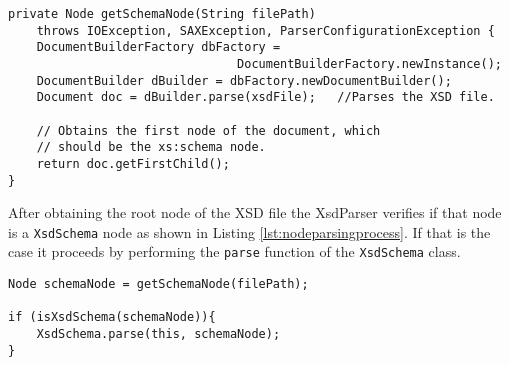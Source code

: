 \begin{minipage}{\linewidth}
\begin{lstlisting}[caption={DOM Document Parsing}, label={lst:nodelist}]
private Node getSchemaNode(String filePath) 
    throws IOException, SAXException, ParserConfigurationException {
    DocumentBuilderFactory dbFactory =                                                              
                                DocumentBuilderFactory.newInstance();
    DocumentBuilder dBuilder = dbFactory.newDocumentBuilder();
    Document doc = dBuilder.parse(xsdFile);   //Parses the XSD file.

    // Obtains the first node of the document, which 
    // should be the xs:schema node.
    return doc.getFirstChild();
}
\end{lstlisting}
\end{minipage}

\noindent
After obtaining the root node of the \ac{XSD} file the XsdParser verifies if that node is a \texttt{XsdSchema} node as shown in Listing \ref{lst:nodeparsingprocess}. If that is the case it proceeds by performing the \texttt{parse} function of the \texttt{XsdSchema} class.  

\bigskip


\begin{minipage}{\linewidth}
\begin{lstlisting}[caption={XsdParser Parsing the XsdSchema Node, which triggers the parsing of the whole XSD document},captionpos=b,label={lst:nodeparsingprocess}]
Node schemaNode = getSchemaNode(filePath);
            
if (isXsdSchema(schemaNode)){
    XsdSchema.parse(this, schemaNode);
}
\end{lstlisting}
\end{minipage}

